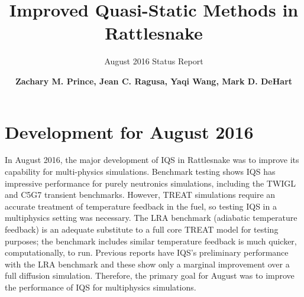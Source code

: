 \documentclass[11pt]{scrartcl}
\title{\vspace{-30mm}\Large Improved Quasi-Static Methods in Rattlesnake}
\subtitle{\large August 2016 Status Report}
\author{ \normalsize \textbf{Zachary M. Prince, Jean C. Ragusa, Yaqi Wang, Mark D. DeHart}}
\begin{document}
\maketitle
{}

\section*{\large Development for August 2016}

In August 2016, the major development of IQS in Rattlesnake was to improve its capability for multi-physics simulations.  Benchmark testing shows IQS has impressive performance for purely neutronics simulations, including the TWIGL and C5G7 transient benchmarks.  However, TREAT simulations require an accurate treatment of temperature feedback in the fuel, so testing IQS in a multiphysics setting was necessary. The LRA benchmark (adiabatic temperature feedback) is an adequate substitute to a full core TREAT model for testing purposes; the benchmark includes similar temperature feedback is much quicker, computationally, to run.  Previous reports have IQS's preliminary performance with the LRA benchmark and these show only a marginal improvement over a full diffusion simulation.  Therefore, the primary goal for August was to improve the performance of IQS for multiphysics simulations.
\end{document}
